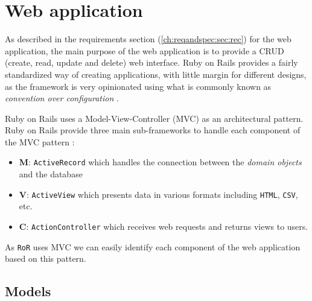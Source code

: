 \begin{tabularx}{\textwidth}{|c|Y|Y|}

\end{tabularx}

\section{Web application}


As described in the requirements section (\ref{ch:reqandspec:sec:rec}) for the web application, the main purpose of the web application is to provide a CRUD (create, read, update and delete) web interface. Ruby on Rails provides a fairly standardized way of creating applications, with little margin for different designs, as the framework is very opinionated using what is commonly known as \textit{convention over configuration} \citep{ruby_on_rails}.

Ruby on Rails uses a Model-View-Controller (MVC) as an architectural pattern. Ruby on Rails provide three main sub-frameworks to handle each component of the MVC pattern \citep{ruby_on_rails}:
\begin{itemize}
    \item \textbf{M}: \texttt{ActiveRecord} which handles the connection between the \textit{domain objects} and the database
    \item \textbf{V}: \texttt{ActiveView} which presents data in various formats including \texttt{HTML}, \texttt{CSV}, etc.
    \item \textbf{C}: \texttt{ActionController} which receives web requests and returns views to users.
\end{itemize}
As \texttt{RoR} uses MVC we can easily identify each component of the web application based on this pattern.

\subsection{Models}

